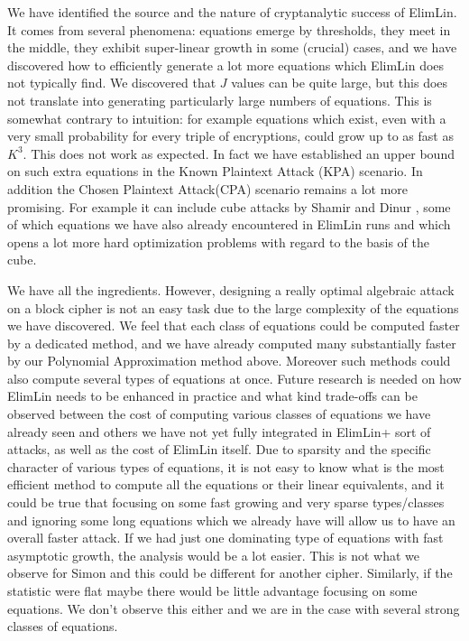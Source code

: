 We have identified the source and the nature of cryptanalytic success of ElimLin. It comes from several phenomena: equations emerge by thresholds, they meet in the middle, they exhibit super-linear growth in some (crucial) cases, and we have discovered how to efficiently generate a lot more equations which ElimLin does not  typically find. We discovered that $J$ values can be quite large, but this does not translate into generating particularly large numbers of equations. This is somewhat contrary to intuition: 
for example equations which exist, even with a very small probability for every triple of encryptions, could grow up to as fast as $K^3$. This does not work as expected. 
In fact we have established an upper bound on such extra equations in the Known Plaintext Attack (KPA) scenario.  
In addition the Chosen Plaintext Attack(CPA) scenario remains a lot more promising. For example it can include cube attacks by Shamir and Dinur \cite{dinur2009cube} , some of which equations we have also already encountered in ElimLin runs and which opens a lot more hard optimization problems with regard to the basis of the cube. 

We have all the ingredients. However, designing a really optimal algebraic attack on a block cipher is not an easy task due to the large complexity of the equations we have discovered. 
We feel that each class of equations could be computed faster by a dedicated method, 
and we have already computed many substantially faster by our Polynomial Approximation method above. 
Moreover such methods could also compute several types of equations at once. 
Future research is needed on how ElimLin needs to be enhanced in practice and what kind trade-offs can be observed between the cost of computing various classes of equations we have already seen and others we have not yet fully integrated in ElimLin+ sort of attacks, as well as the cost of ElimLin itself. Due to sparsity and the specific character of various types of equations, it is not easy to know what is the most efficient method to compute all the equations or their linear equivalents, and it could be true that focusing on some fast growing 
and very sparse types/classes and ignoring some long equations which we already have will allow us to have an overall faster attack. 
If we had just one dominating type of equations with fast asymptotic growth, the analysis would be a lot easier. This is not what we observe for Simon and this could be different for another cipher. Similarly, if the statistic were flat maybe there would be little advantage focusing on some equations. 
We don't observe this either and we are in the case with several strong classes of equations. 


